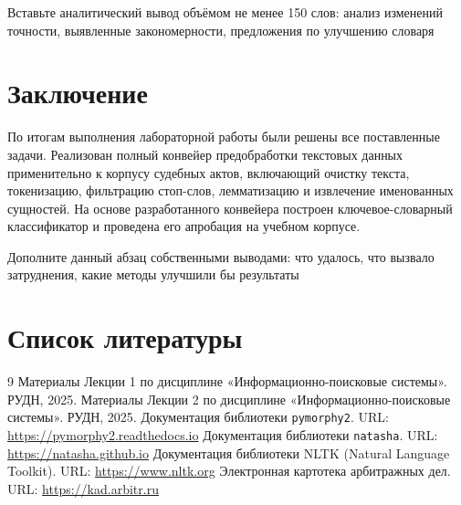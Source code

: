 \documentclass[12pt, a4paper]{report}
\newcommand{\placeholder}[2][Вставьте результат]{%
  \begin{tcolorbox}[placeholderbox, title={#2}]
    #1
  \end{tcolorbox}%
  \vspace{4pt}%
}
\begin{document}
\placeholder[Вставьте аналитический вывод объёмом не менее 150 слов: анализ изменений точности, выявленные закономерности, предложения по улучшению словаря]{Аналитический вывод по индивидуальному заданию}

\chapter{Заключение}

По итогам выполнения лабораторной работы были решены все поставленные задачи.
Реализован полный конвейер предобработки текстовых данных применительно к корпусу
судебных актов, включающий очистку текста, токенизацию, фильтрацию стоп-слов,
лемматизацию и извлечение именованных сущностей. На основе разработанного конвейера
построен ключевое-словарный классификатор и проведена его апробация на учебном корпусе.

\placeholder[Дополните данный абзац собственными выводами: что удалось, что вызвало затруднения, какие методы улучшили бы результаты]{Собственные выводы студента}

\chapter*{Список литературы}

\begin{thebibliography}{9}
    Материалы Лекции 1 по дисциплине «Информационно-поисковые системы».
    РУДН, 2025.
    Материалы Лекции 2 по дисциплине «Информационно-поисковые системы».
    РУДН, 2025.
    Документация библиотеки \texttt{pymorphy2}.
    URL: \url{https://pymorphy2.readthedocs.io}
    Документация библиотеки \texttt{natasha}.
    URL: \url{https://natasha.github.io}
    Документация библиотеки NLTK (Natural Language Toolkit).
    URL: \url{https://www.nltk.org}
    Электронная картотека арбитражных дел.
    URL: \url{https://kad.arbitr.ru}
\end{thebibliography}

\end{document}
